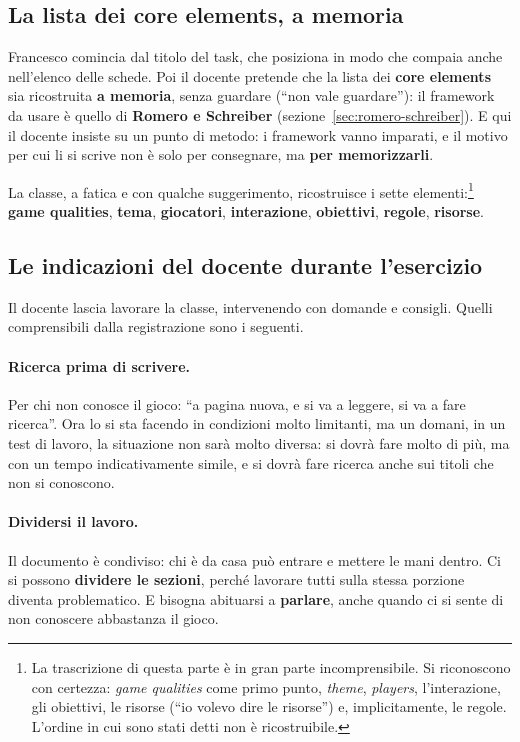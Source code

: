 \subsection{La lista dei core elements, a memoria}

Francesco comincia dal titolo del task, che posiziona in modo che compaia
anche nell'elenco delle schede. Poi il docente pretende che la lista dei
\textbf{core elements} sia ricostruita \textbf{a memoria}, senza guardare
(``non vale guardare''): il framework da usare è quello di \textbf{Romero e
Schreiber} (sezione~\ref{sec:romero-schreiber}). E qui il docente insiste su
un punto di metodo: i framework vanno imparati, e il motivo per cui li si
scrive non è solo per consegnare, ma \textbf{per memorizzarli}.

La classe, a fatica e con qualche suggerimento, ricostruisce i sette
elementi:\footnote{La trascrizione di questa parte è in gran parte
incomprensibile. Si riconoscono con certezza: \emph{game qualities} come
primo punto, \emph{theme}, \emph{players}, l'interazione, gli obiettivi, le
risorse (``io volevo dire le risorse'') e, implicitamente, le regole. L'ordine
in cui sono stati detti non è ricostruibile.} \textbf{game qualities},
\textbf{tema}, \textbf{giocatori}, \textbf{interazione}, \textbf{obiettivi},
\textbf{regole}, \textbf{risorse}.

\subsection{Le indicazioni del docente durante l'esercizio}

Il docente lascia lavorare la classe, intervenendo con domande e consigli.
Quelli comprensibili dalla registrazione sono i seguenti.

\paragraph{Ricerca prima di scrivere.} Per chi non conosce il gioco: ``a
pagina nuova, e si va a leggere, si va a fare ricerca''. Ora lo si sta
facendo in condizioni molto limitanti, ma un domani, in un test di lavoro, la
situazione non sarà molto diversa: si dovrà fare molto di più, ma con un
tempo indicativamente simile, e si dovrà fare ricerca anche sui titoli che
non si conoscono.

\paragraph{Dividersi il lavoro.} Il documento è condiviso: chi è da casa può
entrare e mettere le mani dentro. Ci si possono \textbf{dividere le sezioni},
perché lavorare tutti sulla stessa porzione diventa problematico. E bisogna
abituarsi a \textbf{parlare}, anche quando ci si sente di non conoscere
abbastanza il gioco.

